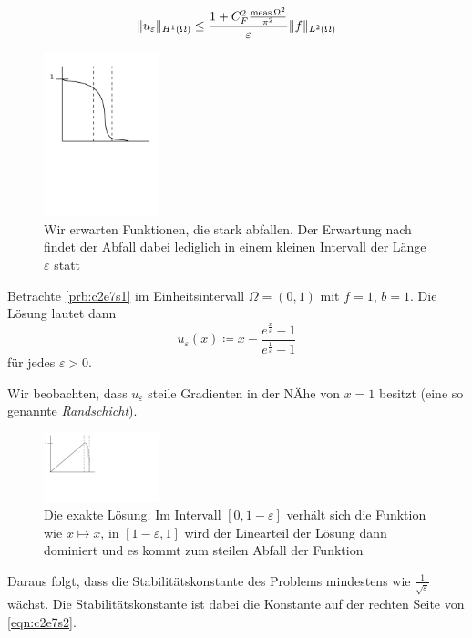 \documentclass[../skript.tex]{subfiles}
\begin{document}
\begin{equation}\label{eqn:c2e7s2}
	\| u_\varepsilon\|_{H^1(\Omega)} \leq \frac{1+C_F^2\frac{\operatorname{meas}{\Omega}^2}{\pi^2}}{\varepsilon}\|f\|_{L^2(\Omega)}
\end{equation}
\begin{figure}[ht]
	\centering
	\includegraphics[width=0.3\textwidth]{Images/5-12-heuristik.pdf}
	\caption{Wir erwarten Funktionen, die stark abfallen. Der Erwartung nach findet der Abfall dabei lediglich in einem kleinen Intervall der Länge $\varepsilon$ statt}
	\label{figure_heuristik}
\end{figure}
\begin{example}\label{ex:c2e7s1}
	Betrachte \cref{prb:c2e7s1} im Einheitsintervall $\Omega=(0,1)$ mit $f=1$, $b=1$. Die Lösung lautet dann
	\[
		u_\varepsilon(x)\coloneqq x-\frac{e^{\frac{x}{\varepsilon}}-1}{e^{\frac{1}{\varepsilon}}-1}
	\]
	für jedes $\varepsilon > 0$.\par
	Wir beobachten, dass $u_\varepsilon$ steile Gradienten in der NÄhe von $x=1$ besitzt (eine so genannte \emph{Randschicht}).
	\begin{figure}[ht]
	\centering
		\includegraphics[width=0.3\textwidth]{Images/5-12-ergebnis.pdf}
		\caption{Die exakte Lösung. Im Intervall $[0,1-\varepsilon]$ verhält sich die Funktion wie $x\mapsto x$, in $[1-\varepsilon,1]$ wird der Linearteil der Lösung dann dominiert und es kommt zum steilen Abfall der Funktion}
		\label{figure_loesung}
	\end{figure}
	Daraus folgt, dass die Stabilitätskonstante des Problems mindestens wie $\frac{1}{\sqrt{\varepsilon}}$ wächst. Die Stabilitätskonstante ist dabei die Konstante auf der rechten Seite von \cref{eqn:c2e7s2}.
\end{example}
\end{document}
